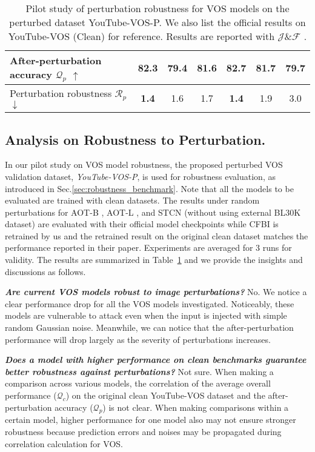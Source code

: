 \documentclass[sigconf]{acmart}
\begin{document}
\begin{table}[t]
{\begin{tabular}{@{}l|ccc|ccc@{}}
After-perturbation accuracy $\mathcal{Q}_p$ $\uparrow$   & \textbf{82.3}  	
             & 79.4     & 81.6     & \textbf{82.7}    & 81.7                       & 79.7                       \\ \midrule\midrule
Perturbation robustness $\mathcal{R}_p$ $\downarrow$  & \textbf{1.4}  	
             &  1.6    & 1.7     & \textbf{1.4}    & 1.9                    & 3.0                       \\ 
 \bottomrule
\end{tabular}}
    	\caption{Pilot study of perturbation robustness for VOS models on the perturbed dataset {YouTube-VOS-P}. We also list the official results on {YouTube-VOS} (Clean) for reference. Results are reported with $\mathcal{J}\&\mathcal{F}$ .}
    	\label{tab:robustness}
\end{table} \subsection{Analysis on Robustness to Perturbation.}

\noindent In our pilot study on VOS model robustness, the proposed perturbed VOS validation dataset, \textit{YouTube-VOS-P}, is used for robustness evaluation, as introduced in Sec.\ref{sec:robustness_benchmark}. Note that all the models to be evaluated are trained with clean datasets. The results under random perturbations for AOT-B \cite{yang2021associating}, AOT-L \cite{yang2021associating}, and STCN \cite{cheng2021rethinking} (without using external BL30K dataset\cite{cheng2021modular}) are evaluated with their official model checkpoints while CFBI \cite{yang2020collaborative} is retrained by us and the retrained result on the original clean dataset matches the performance reported in their paper. Experiments are averaged for 3 runs for validity. The results are summarized in Table~\ref{tab:robustness} and we provide the insights and discussions as follows.

\noindent\textbf{\textit{Are current VOS models robust to image perturbations?}} No. We notice a clear performance drop for all the VOS models investigated. Noticeably, these models are vulnerable to attack even when the input is injected with simple random Gaussian noise. Meanwhile, we can notice that the after-perturbation performance will drop largely as the severity of perturbations increases.

\noindent\textbf{\textit{Does a model with higher performance on clean benchmarks guarantee better robustness against perturbations?}} Not sure. When making a comparison across various models, the correlation of the average overall performance ($\mathcal{Q}_c$) on the original clean YouTube-VOS dataset and the after-perturbation accuracy ($\mathcal{Q}_p$) is not clear. When making comparisons within a certain model, higher performance for one model also may not ensure stronger robustness because prediction errors and noises may be propagated during correlation calculation for VOS. 
\end{document}
